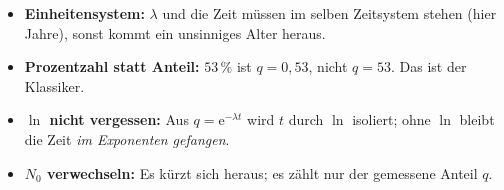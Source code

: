 \begin{achtung}
\begin{itemize}
  \item \textbf{Einheitensystem:} $\lambda$ und die Zeit müssen im selben
        Zeitsystem stehen (hier Jahre), sonst kommt ein unsinniges Alter
        heraus.
  \item \textbf{Prozentzahl statt Anteil:} $53\,\%$ ist $q=0{,}53$, nicht
        $q=53$. Das ist der Klassiker.
  \item \textbf{$\ln$ nicht vergessen:} Aus $q=\mathrm e^{-\lambda t}$
        wird $t$ durch $\ln$ isoliert; ohne $\ln$ bleibt die Zeit \emph{im
        Exponenten gefangen}.
  \item \textbf{$N_0$ verwechseln:} Es kürzt sich heraus; es zählt nur der
        gemessene Anteil $q$.
\end{itemize}
\end{achtung}
